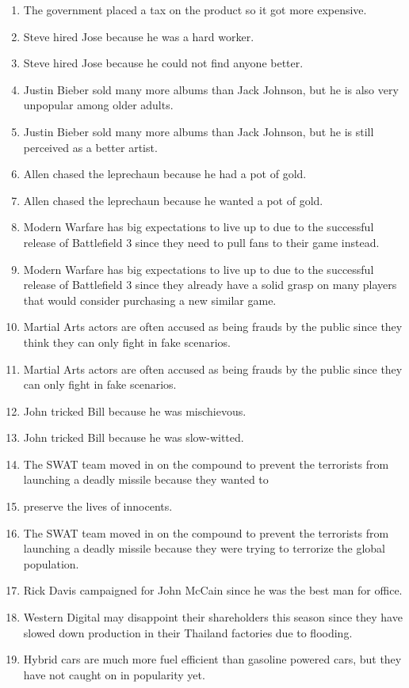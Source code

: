 \documentclass{article}
\begin{document}
\begin{enumerate}
	\item The government placed a tax on the product so it got more expensive.
	\item Steve hired Jose because he was a hard worker.
	\item Steve hired Jose because he could not find anyone better.
	\item Justin Bieber sold many more albums than Jack Johnson, but he is also very unpopular among older adults.
	\item Justin Bieber sold many more albums than Jack Johnson, but he is still perceived as a better artist.
	\item Allen chased the leprechaun because he had a pot of gold.
	\item Allen chased the leprechaun because he wanted a pot of gold.
	\item Modern Warfare has big expectations to live up to due to the successful release of Battlefield 3 since they need to pull fans to their game instead.
	\item Modern Warfare has big expectations to live up to due to the successful release of Battlefield 3 since they already have a solid grasp on many players that would consider purchasing a new similar game.
	\item Martial Arts actors are often accused as being frauds by the public since they think they can only fight in fake scenarios.
	\item Martial Arts actors are often accused as being frauds by the public since they can only fight in fake scenarios.
	\item John tricked Bill because he was mischievous.
	\item John tricked Bill because he was slow-witted.
	\item The SWAT team moved in on the compound to prevent the terrorists from launching a deadly missile because they wanted to \item preserve the lives of innocents.
	\item The SWAT team moved in on the compound to prevent the terrorists from launching a deadly missile because they were trying to terrorize the global population.
	\item Rick Davis campaigned for John McCain since he was the best man for office.
	\item Western Digital may disappoint their shareholders this season since they have slowed down production in their Thailand factories due to flooding.
	\item Hybrid cars are much more fuel efficient than gasoline powered cars, but they have not caught on in popularity yet.

\end{enumerate}
\end{document}
